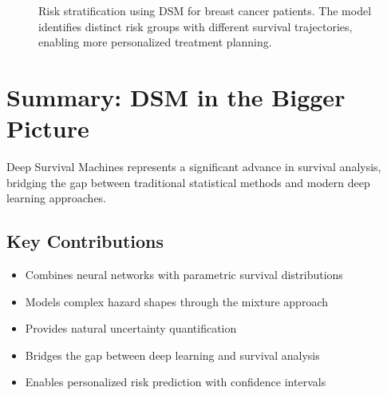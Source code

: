 \begin{figure}[htbp]
    \centering
    \caption{Risk stratification using DSM for breast cancer patients. The model identifies distinct risk groups with different survival trajectories, enabling more personalized treatment planning.}
    \label{fig:risk-stratification}
\end{figure}

\section{Summary: DSM in the Bigger Picture}

Deep Survival Machines represents a significant advance in survival analysis, bridging the gap between traditional statistical methods and modern deep learning approaches.

\subsection{Key Contributions}

\begin{itemize}
    \item Combines neural networks with parametric survival distributions
    \item Models complex hazard shapes through the mixture approach
    \item Provides natural uncertainty quantification
    \item Bridges the gap between deep learning and survival analysis
    \item Enables personalized risk prediction with confidence intervals
\end{itemize}

